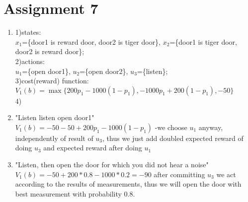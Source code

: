 \documentclass{article}
\begin{document}
\section*{Assignment 7}
\begin{enumerate}
\item 1)states:\\$x_1$=\{door1 is reward door, door2 is tiger door\}, 
$x_2$=\{door1 is tiger door, door2 is reward door\};
\\2)actions:\\
$u_1$=\{open door1\}, 
$u_2$=\{open door2\}, 
$u_3$=\{listen\};
\\3)cost(reward) function: \\
$V_{1}(b)=\max\{200p_{1}-1000(1-p_{1}), -1000p_{1}+200(1-p_{1}), -50\}$
\\4)
\item "Listen listen open door1"\\
$V_{1}(b)=-50-50+200p_{1}-1000(1-p_{1})$ -we choose $u_{1}$ anyway, independently of result of $u_{3}$, thus we just add doubled expected reward of doing $u_{3}$ and expected reward after doing $u_{1}$
\item "Listen,
then open the door for which you did not hear a noise"
$V_{1}(b)=-50+200*0.8-1000*0.2=-90$ after committing $u_{3}$ we act according to the results of measurements, thus we will open the door with best measurement with probability 0.8.
\end{enumerate}
\end{document}
